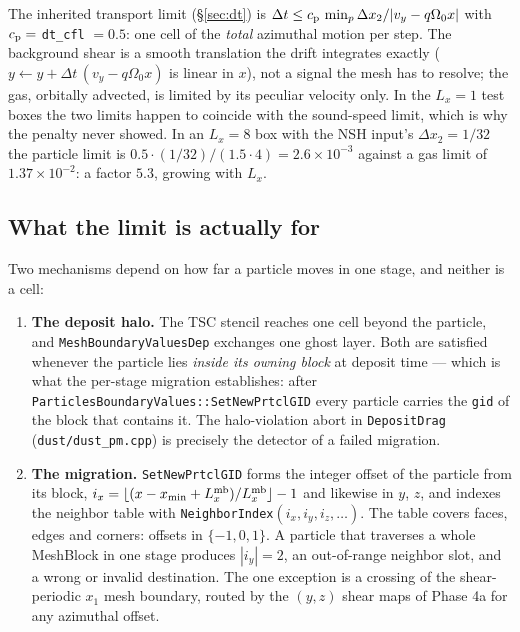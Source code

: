 \documentclass[11pt]{article}
\newcommand{\code}[1]{\texttt{#1}}
\newcommand{\file}[1]{\texttt{\small #1}}
\newcommand{\fn}[1]{\texttt{\small #1}}
\newcommand{\Om}{\Omega_0}
\newcommand{\qom}{q\Om}
\begin{document}
The inherited transport limit (\S\ref{sec:dt}) is $\Delta t \le c_{\rm p}\,\min_p
\Delta x_2/|v_y - \qom x|$ with $c_{\rm p} = $ \code{dt\_cfl} $= 0.5$: one cell of the
\emph{total} azimuthal motion per step. The background shear is a smooth translation
the drift integrates exactly ($y \leftarrow y + \Delta t\,(v_y - \qom x)$ is linear in
$x$), not a signal the mesh has to resolve; the gas, orbitally advected, is limited by
its peculiar velocity only. In the $L_x = 1$ test boxes the two limits happen to
coincide with the sound-speed limit, which is why the penalty never showed. In an
$L_x = 8$ box with the NSH input's $\Delta x_2 = 1/32$ the particle limit is
$0.5\cdot(1/32)/(1.5\cdot 4) = 2.6\times10^{-3}$ against a gas limit of
$1.37\times10^{-2}$: a factor $5.3$, growing with $L_x$.

\subsection{What the limit is actually for}

Two mechanisms depend on how far a particle moves in one stage, and neither is a
cell:

\begin{enumerate}\itemsep3pt
\item \textbf{The deposit halo.} The TSC stencil reaches one cell beyond the particle,
      and \code{MeshBoundaryValuesDep} exchanges one ghost layer. Both are satisfied
      whenever the particle lies \emph{inside its owning block} at deposit time ---
      which is what the per-stage migration establishes: after
      \fn{ParticlesBoundaryValues::SetNewPrtclGID} every particle carries the
      \code{gid} of the block that contains it. The halo-violation abort in
      \fn{DepositDrag} (\file{dust/dust\_pm.cpp}) is precisely the detector of a failed
      migration.
\item \textbf{The migration.} \fn{SetNewPrtclGID} forms the integer offset of the
      particle from its block, $i_x = \lfloor (x - x_{\min} + L_x^{\rm mb})/L_x^{\rm mb}
      \rfloor - 1$ and likewise in $y$, $z$, and indexes the neighbor table with
      \fn{NeighborIndex}$(i_x,i_y,i_z,\ldots)$. The table covers faces, edges and
      corners: offsets in $\{-1,0,1\}$. A particle that traverses a whole MeshBlock in
      one stage produces $|i_y| = 2$, an out-of-range neighbor slot, and a wrong or
      invalid destination. The one exception is a crossing of the shear-periodic
      $x_1$ mesh boundary, routed by the $(y,z)$ shear maps of Phase 4a for any
      azimuthal offset.
\end{enumerate}
\end{document}
